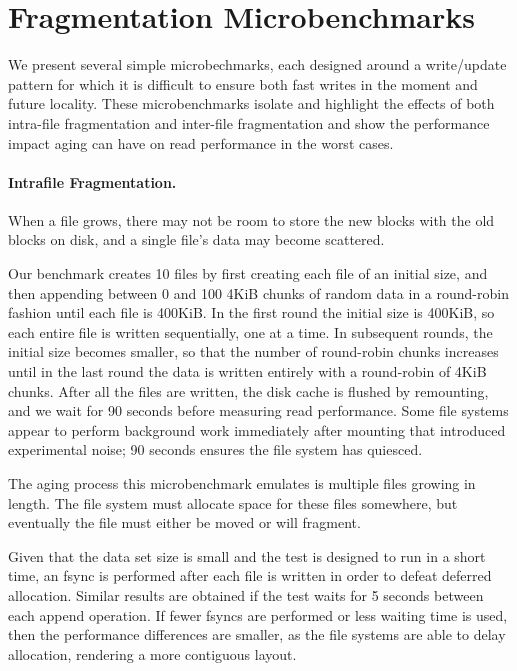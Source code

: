 \section{Fragmentation Microbenchmarks}\label{sec:fsa-microbenchmarks}

We present several simple microbechmarks, each designed around a write/update
pattern for which it is difficult to ensure both fast writes in the moment and
future locality.  These microbenchmarks isolate and highlight the effects of
both intra-file fragmentation and inter-file fragmentation and show the
performance impact aging can have on read performance in the worst cases.

\paragraph{Intrafile Fragmentation.} When a file grows, there may not be room
to store the new blocks with the old blocks on disk, and a single file's data
may become scattered.  

Our benchmark creates 10 files by first creating each file of an initial size,
and then appending between 0 and 100 4KiB chunks of random data in a
round-robin fashion until each file is 400KiB.  In the first round the initial
size is 400KiB, so each entire file is written sequentially, one at a time. In
subsequent rounds, the initial size becomes smaller, so that the number of
round-robin chunks increases until in the last round the data is written
entirely with a round-robin of 4KiB chunks. After all the files are written,
the disk cache is flushed by remounting, and we wait for 90 seconds before
measuring read performance.  Some file systems appear to perform background
work immediately after mounting that introduced experimental noise; 90 seconds
ensures the file system has quiesced.

The aging process this microbenchmark emulates is multiple files growing in
length. The file system must allocate space for these files somewhere, but
eventually the file must either be moved or will fragment.

Given that the data set size is small and the test is designed to run in a
short time, an fsync is performed after each file is written in order to defeat
deferred allocation. Similar results are obtained if the test waits for 5
seconds between each append operation. If fewer fsyncs are performed or less
waiting time is used, then the performance differences are smaller, as the file
systems are able to delay allocation, rendering a more contiguous layout.

